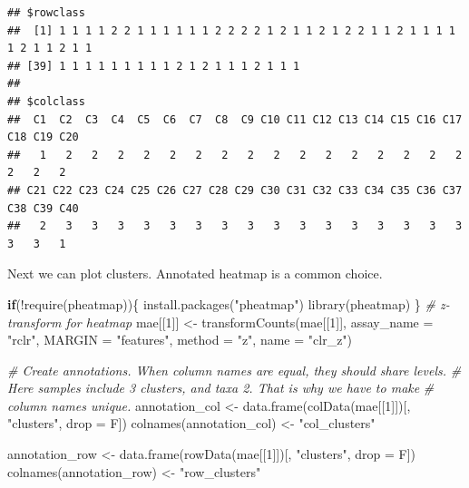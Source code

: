 \documentclass[
]{book}
\newenvironment{Shaded}{\begin{snugshade}}{\end{snugshade}}
\newcommand{\AttributeTok}[1]{\textcolor[rgb]{0.77,0.63,0.00}{#1}}
\newcommand{\CommentTok}[1]{\textcolor[rgb]{0.56,0.35,0.01}{\textit{#1}}}
\newcommand{\ControlFlowTok}[1]{\textcolor[rgb]{0.13,0.29,0.53}{\textbf{#1}}}
\newcommand{\DecValTok}[1]{\textcolor[rgb]{0.00,0.00,0.81}{#1}}
\newcommand{\FunctionTok}[1]{\textcolor[rgb]{0.00,0.00,0.00}{#1}}
\newcommand{\NormalTok}[1]{#1}
\newcommand{\OtherTok}[1]{\textcolor[rgb]{0.56,0.35,0.01}{#1}}
\newcommand{\SpecialCharTok}[1]{\textcolor[rgb]{0.00,0.00,0.00}{#1}}
\newcommand{\StringTok}[1]{\textcolor[rgb]{0.31,0.60,0.02}{#1}}
\begin{document}
\begin{verbatim}
## $rowclass
##  [1] 1 1 1 1 2 2 1 1 1 1 1 1 2 2 2 2 1 2 1 1 2 1 2 2 1 1 2 1 1 1 1 1 2 1 1 2 1 1
## [39] 1 1 1 1 1 1 1 1 1 2 1 2 1 1 1 2 1 1 1
## 
## $colclass
##  C1  C2  C3  C4  C5  C6  C7  C8  C9 C10 C11 C12 C13 C14 C15 C16 C17 C18 C19 C20 
##   1   2   2   2   2   2   2   2   2   2   2   2   2   2   2   2   2   2   2   2 
## C21 C22 C23 C24 C25 C26 C27 C28 C29 C30 C31 C32 C33 C34 C35 C36 C37 C38 C39 C40 
##   2   3   3   3   3   3   3   3   3   3   3   3   3   3   3   3   3   3   3   1
\end{verbatim}

Next we can plot clusters. Annotated heatmap is a common choice.

\begin{Shaded}
\begin{Highlighting}[]
\ControlFlowTok{if}\NormalTok{(}\SpecialCharTok{!}\FunctionTok{require}\NormalTok{(pheatmap))\{}
    \FunctionTok{install.packages}\NormalTok{(}\StringTok{"pheatmap"}\NormalTok{)}
    \FunctionTok{library}\NormalTok{(pheatmap)}
\NormalTok{\}}
\CommentTok{\# z{-}transform for heatmap}
\NormalTok{mae[[}\DecValTok{1}\NormalTok{]] }\OtherTok{\textless{}{-}} \FunctionTok{transformCounts}\NormalTok{(mae[[}\DecValTok{1}\NormalTok{]], }\AttributeTok{assay\_name =} \StringTok{"rclr"}\NormalTok{,}
                            \AttributeTok{MARGIN =} \StringTok{"features"}\NormalTok{,}
                            \AttributeTok{method =} \StringTok{"z"}\NormalTok{, }\AttributeTok{name =} \StringTok{"clr\_z"}\NormalTok{)}

\CommentTok{\# Create annotations. When column names are equal, they should share levels. }
\CommentTok{\# Here samples include 3 clusters, and taxa 2. That is why we have to make }
\CommentTok{\# column names unique. }
\NormalTok{annotation\_col }\OtherTok{\textless{}{-}} \FunctionTok{data.frame}\NormalTok{(}\FunctionTok{colData}\NormalTok{(mae[[}\DecValTok{1}\NormalTok{]])[, }\StringTok{"clusters"}\NormalTok{, }\AttributeTok{drop =}\NormalTok{ F])}
\FunctionTok{colnames}\NormalTok{(annotation\_col) }\OtherTok{\textless{}{-}} \StringTok{"col\_clusters"}

\NormalTok{annotation\_row }\OtherTok{\textless{}{-}} \FunctionTok{data.frame}\NormalTok{(}\FunctionTok{rowData}\NormalTok{(mae[[}\DecValTok{1}\NormalTok{]])[, }\StringTok{"clusters"}\NormalTok{, }\AttributeTok{drop =}\NormalTok{ F])}
\FunctionTok{colnames}\NormalTok{(annotation\_row) }\OtherTok{\textless{}{-}} \StringTok{"row\_clusters"}
\end{Highlighting}
\end{Shaded}
\end{document}
